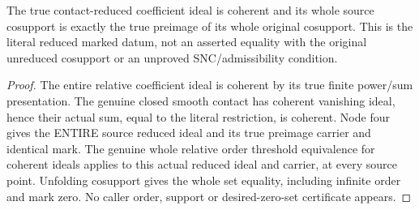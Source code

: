 \begin{theorem}
\label{hir:submersion-contact-restriction-reduced-cosupport}
\leanok
The true contact-reduced coefficient ideal is coherent and its whole source
cosupport is exactly the true preimage of its whole original cosupport.
This is the literal reduced marked datum, not an asserted equality with the
original unreduced cosupport or an unproved SNC/admissibility condition.
\end{theorem}
\begin{proof}
The entire relative coefficient ideal is coherent by its true finite
power/sum presentation. The genuine closed smooth contact has coherent
vanishing ideal, hence their actual sum, equal to the literal restriction,
is coherent. Node four gives the ENTIRE source reduced ideal and its true
preimage carrier and identical mark. The genuine whole relative order
threshold equivalence for coherent ideals applies to this actual reduced
ideal and carrier, at every source point. Unfolding cosupport gives the
whole set equality, including infinite order and mark zero. No caller order,
support or desired-zero-set certificate appears.
\end{proof}

